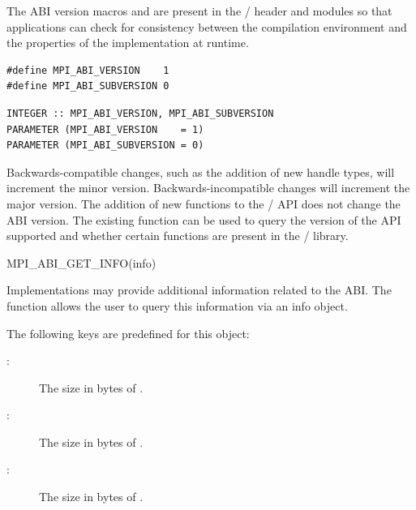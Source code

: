 The ABI version macros  and
 are present in the \MPI/ header and modules
so that applications can check for consistency between the compilation
environment and the properties of the implementation at runtime.

%
%
\begin{lstlisting}[language={[MPI]C}]
#define MPI_ABI_VERSION    1
#define MPI_ABI_SUBVERSION 0
\end{lstlisting}
\begin{lstlisting}[language={[MPI]Fortran}]
INTEGER :: MPI_ABI_VERSION, MPI_ABI_SUBVERSION
PARAMETER (MPI_ABI_VERSION    = 1)
PARAMETER (MPI_ABI_SUBVERSION = 0)
\end{lstlisting}
\noindent

Backwards-compatible changes, such as the addition of new handle types,
will increment the minor version.
Backwards-incompatible changes will increment the major version.
The addition of new functions to the \MPI/ API
does not change the ABI version.
The existing function  can be used
to query the version of the API supported and whether certain
functions are present in the \MPI/ library.

\begin{funcdef}{MPI\_ABI\_GET\_INFO}{(\mbox{info})}
\end{funcdef}

Implementations may provide additional information related to the ABI.
The function  allows the user to query
this information via an info object.

The following keys are predefined for this object:
\begin{description}
\item[:] The size in bytes of .
\item[:] The size in bytes of .
\item[:] The size in bytes of .
\end{description}

